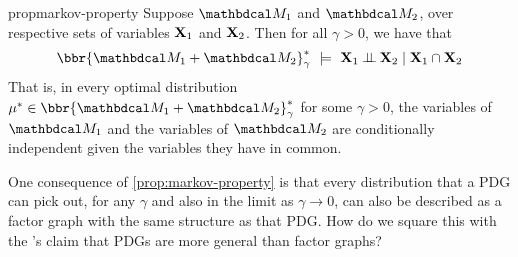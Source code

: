 \documentclass[twoside]{article}
\begin{document}
\begin{linked}{prop}{markov-property}
	Suppose $\dg M_1$ and $\dg M_2$, over respective sets of variables $\mathbf{X}_1$ and $\mathbf{X}_2$.
	Then for all $\gamma > 0$, we have that
	\[
	 	\bbr{\dg M_1 \bundle \dg M_2}^*_\gamma
			~\models~
		\mat X_1 \mathbin{\bot\!\!\!\bot} \mat X_2 \mid \mat X_1 \cap \mat X_2
	\]
	That is, in every optimal distribution $\mu^* \in \bbr{\dg M_1 \bundle \dg M_2}^*_\gamma$ for some $\gamma>0$, the variables of $\dg M_1$ and the variables of $\dg M_2$ are conditionally independent given the variables they have in common.
\end{linked}

One consequence of \cref{prop:markov-property} is that every distribution that a PDG
can pick out, for any $\gamma$ and also in the limit as $\gamma \to 0$, can also be described as a factor graph with the same structure as that PDG.
How do we square this with the \citeauthor{pdg-aaai}'s claim that PDGs are more general than factor graphs?









\begin{theorem}
    
\end{theorem}
\end{document}
